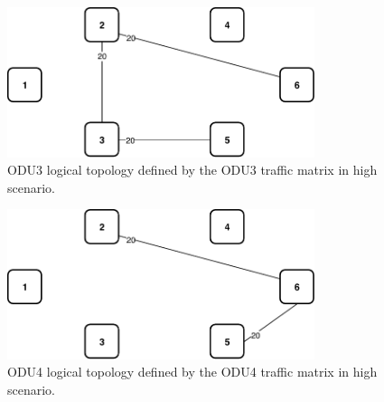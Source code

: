 \begin{figure}[h!]
\centering
\includegraphics[width=9cm]{sdf/ilp/opaque_survivability/figures/logical_topology_ODU3_high}
\caption{ODU3 logical topology defined by the ODU3 traffic matrix in high scenario.}
\label{logical_ODU3_high}
\end{figure}

\begin{figure}[h!]
\centering
\includegraphics[width=9cm]{sdf/ilp/opaque_survivability/figures/logical_topology_ODU4_high}
\caption{ODU4 logical topology defined by the ODU4 traffic matrix in high scenario.}
\label{logical_ODU4_high}
\end{figure}

